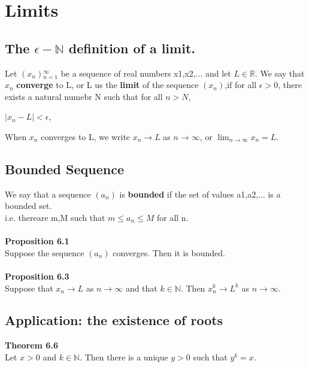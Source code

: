 \documentclass{article}
\begin{document}
\newpage

\section {Limits}

\subsection{The $\epsilon-\mathbb{N}$ definition of a limit.}
Let ${(x_{n})}{_{n=1}^{\infty}}$ be a sequence of real numbers x1,x2,... and let $L\in \mathbb{R}$. We say that $x_{n}$ \textbf{converge} to L, or L us the \textbf{limit} of the sequence $(x_{n})$,if for all $\epsilon > 0$, there exists a natural numebr N such that for all $n>N$,\\

\begin{center}

$|x_{n}-L| < \epsilon$,\\

\end{center}


When $x_{n}$ converges to L, we write $x_{n} \rightarrow L$ as $n\rightarrow \infty$, or $\lim_{n\rightarrow \infty}x_{n}=L$.

\subsection{Bounded Sequence}

We say that a sequence $(a_{n})$ is \textbf{bounded} if the set of values {a1,a2,...} is a bounded set. 
\\i.e. thereare m,M such that $m \leq a_{n} \leq M$ for all n.\\
\\
\textbf{Proposition 6.1}\\
Suppose the sequence $(a_{n})$ converges. Then it is bounded.\\
\\
\textbf{Proposition 6.3}\\
Suppose that $x_{n} \rightarrow L$ as $n \rightarrow \infty$ and that $k \in \mathbb{N}$. Then $x{_{n}^{k}} \rightarrow L^{k}$ as $n \rightarrow \infty$.\\




\subsection {Application: the existence of roots}
\textbf{Theorem 6.6}\\
Let $x>0$ and $k \in \mathbb{N}$. Then there is a unique $y>0$ such that $y^{k}=x$.\\
\end{document}
